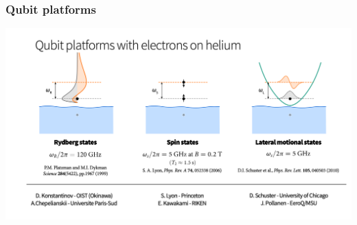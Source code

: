 \documentclass{beamer}
\begin{document}
\begin{frame}
\frametitle{Qubit platforms}

\vspace{6mm}

\centerline{\includegraphics[width=1.2\linewidth]{qcfigures/Elhelium2.png}}

\vspace{6mm}
\end{frame}
\end{document}
